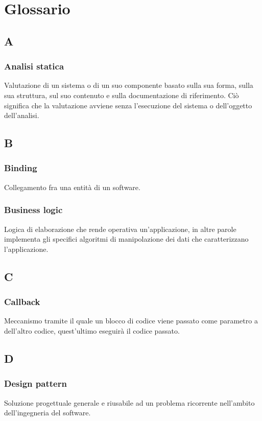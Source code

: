 \section{Glossario}

\subsection*{A}
\subsubsection*{Analisi statica}
Valutazione di un sistema o di un suo componente basato sulla sua forma, sulla sua struttura, sul suo contenuto e sulla documentazione di riferimento. Ciò significa che la valutazione avviene senza l'esecuzione del sistema o dell'oggetto dell'analisi.

\subsection*{B}
\subsubsection*{Binding}
Collegamento fra una entità di un software.
\subsubsection*{Business logic}
Logica di elaborazione che rende operativa un'applicazione, in altre parole implementa gli specifici algoritmi di manipolazione dei dati che caratterizzano l'applicazione.

\subsection*{C}
\subsubsection*{Callback}
Meccanismo tramite il quale un blocco di codice viene passato come parametro a dell'altro codice, quest'ultimo eseguirà il codice passato.

\subsection*{D}
\subsubsection*{Design pattern}
Soluzione progettuale generale e riusabile ad un problema ricorrente nell'ambito dell'ingegneria del software.
